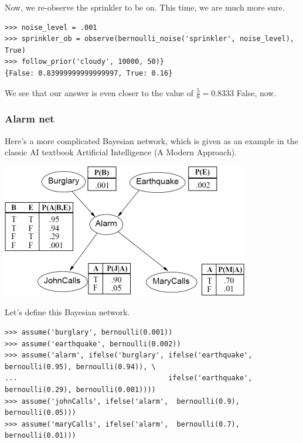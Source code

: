 \documentclass[11pt]{article}
\begin{document}
\noindent  Now, we re-observe the sprinkler to be on.  This time, we are much more sure.

\begin{small}
\begin{verbatim}
>>> noise_level = .001
>>> sprinkler_ob = observe(bernoulli_noise('sprinkler', noise_level), True)
>>> follow_prior('cloudy', 10000, 50)}
{False: 0.83999999999999997, True: 0.16}
\end{verbatim}
\end{small}

\noindent We see that our answer is even closer to the value of $\frac{5}{6} = 0.8\overline{333}$ False, now.

\subsubsection{Alarm net}

Here's a more complicated Bayesian network, which is given as an example in the classic AI textbook Artificial Intelligence (A Modern Approach).  
\begin{center} \includegraphics{burglary.png} \end{center}

\noindent Let's define this Bayesian network.

\begin{small}
\begin{verbatim}
>>> assume('burglary', bernoulli(0.001))
>>> assume('earthquake', bernoulli(0.002))
>>> assume('alarm', ifelse('burglary', ifelse('earthquake', bernoulli(0.95), bernoulli(0.94)), \
...                                    ifelse('earthquake', bernoulli(0.29), bernoulli(0.001))))
>>> assume('johnCalls', ifelse('alarm',  bernoulli(0.9), bernoulli(0.05)))
>>> assume('maryCalls', ifelse('alarm',  bernoulli(0.7), bernoulli(0.01)))
\end{verbatim}
\end{small}
\end{document}
